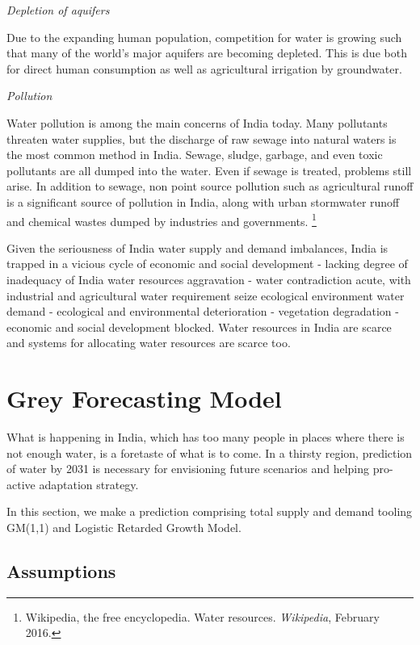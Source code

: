 \documentclass[tcn = 45538, sheet = true, abstract = true]{mcmthesis}
\begin{document}
\begin{itemize}
\emph{Depletion of aquifers}

Due to the expanding human population, 
competition for water is growing such that many of the world's major aquifers are becoming depleted. 
This is due both for direct human consumption as well as agricultural irrigation by groundwater. 

\emph{Pollution}

Water pollution is among the main concerns of India today. 
Many pollutants threaten water supplies, 
but the discharge of raw sewage into natural waters is the most common method in India. 
Sewage, 
sludge, 
garbage, 
and even toxic pollutants are all dumped into the water. 
Even if sewage is treated, 
problems still arise. 
In addition to sewage, 
non point source pollution such as agricultural runoff is a significant source of pollution in India, 
along with urban stormwater runoff and chemical wastes dumped by industries and governments.
\footnote{Wikipedia, the free encyclopedia. 
Water resources.  
\emph{Wikipedia}, 
February 2016.}

\end{itemize}

Given the seriousness of India water supply and demand imbalances, 
India is trapped in a vicious cycle of economic and social development 
- lacking degree of inadequacy of India water resources aggravation 
- water contradiction acute, 
with industrial and agricultural water requirement seize ecological environment water demand 
- ecological and environmental deterioration 
- vegetation degradation 
- economic and social development blocked. 
Water resources in India are scarce and systems for allocating water resources are scarce too.

\section{Grey Forecasting Model}

\hspace{1.5 em} What is happening in India, 
which has too many people in places where there is not enough water, 
is a foretaste of what is to come. 
In a thirsty region, 
prediction of water by 2031 is necessary for envisioning future scenarios and helping pro-active adaptation strategy. 

In this section, 
we make a prediction comprising total supply and demand tooling GM(1,1) and Logistic Retarded Growth Model.

\subsection{Assumptions}
\end{document}
